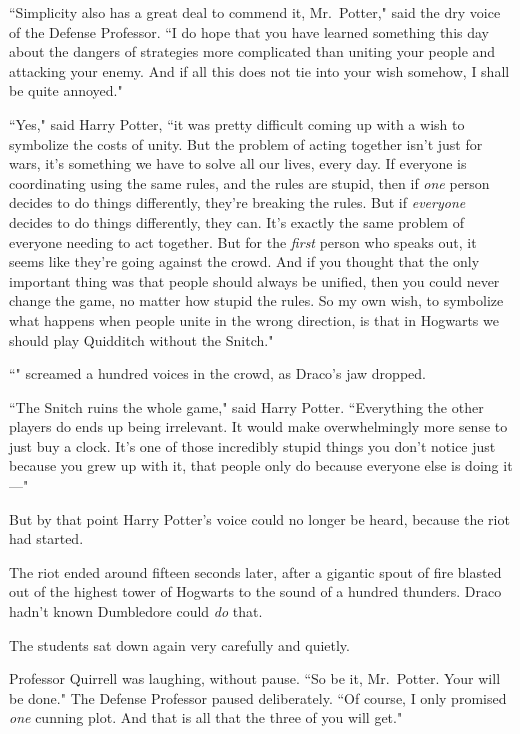 ``Simplicity also has a great deal to commend it, Mr.~Potter," said the dry voice of the Defense Professor. ``I do hope that you have learned something this day about the dangers of strategies more complicated than uniting your people and attacking your enemy. And if all this does not tie into your wish somehow, I shall be quite annoyed."

``Yes," said Harry Potter, ``it was pretty difficult coming up with a wish to symbolize the costs of unity. But the problem of acting together isn't just for wars, it's something we have to solve all our lives, every day. If everyone is coordinating using the same rules, and the rules are stupid, then if \emph{one} person decides to do things differently, they're breaking the rules. But if \emph{everyone} decides to do things differently, they can. It's exactly the same problem of everyone needing to act together. But for the \emph{first} person who speaks out, it seems like they're going against the crowd. And if you thought that the only important thing was that people should always be unified, then you could never change the game, no matter how stupid the rules. So my own wish, to symbolize what happens when people unite in the wrong direction, is that in Hogwarts we should play Quidditch without the Snitch."

``" screamed a hundred voices in the crowd, as Draco's jaw dropped.

``The Snitch ruins the whole game," said Harry Potter. ``Everything the other players do ends up being irrelevant. It would make overwhelmingly more sense to just buy a clock. It's one of those incredibly stupid things you don't notice just because you grew up with it, that people only do because everyone else is doing it---"

But by that point Harry Potter's voice could no longer be heard, because the riot had started.

\later

The riot ended around fifteen seconds later, after a gigantic spout of fire blasted out of the highest tower of Hogwarts to the sound of a hundred thunders. Draco hadn't known Dumbledore could \emph{do} that.

The students sat down again very carefully and quietly.

Professor Quirrell was laughing, without pause. ``So be it, Mr.~Potter. Your will be done." The Defense Professor paused deliberately. ``Of course, I only promised \emph{one} cunning plot. And that is all that the three of you will get."

